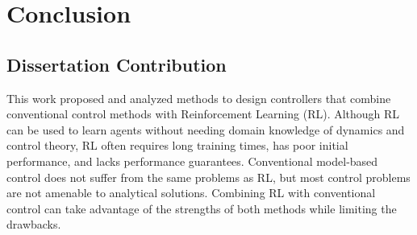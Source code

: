 
\chapter{Conclusion}

\section{Dissertation Contribution}

This work proposed and analyzed methods to design controllers that combine conventional control methods with Reinforcement Learning (RL). Although RL can be used to learn agents without needing domain knowledge of dynamics and control theory, RL often requires long training times, has poor initial performance, and lacks performance guarantees. Conventional model-based control does not suffer from the same problems as RL, but most control problems are not amenable to analytical solutions. Combining RL with conventional control can take advantage of the strengths of both methods while limiting the drawbacks.

